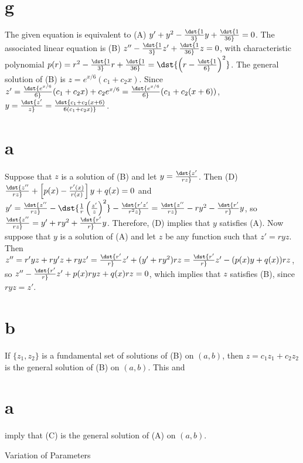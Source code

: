 \documentclass[dvips]{book}
\renewcommand{\exer}[1]{\par\medskip\;\noindent{\color{red}\bf #1.}}
\numberwithin{example}{section}
\numberwithin{equation}{section}
\numberwithin{theorem}{section}
\numberwithin{table}{section}
\numberwithin{figure}{section}
\begin{document}
\part{g} The given equation is equivalent to (A)
$y'+y^2-\dst{1\over3}y+\dst{1\over36}=0$. The associated linear
equation is (B) $z''-\dst{1\over3}z'+\dst{1\over36}z=0$, with
characteristic polynomial $p(r)=r^2-\dst{1\over3}r+\dst{1\over36}=
\dst{\left(r-\dst{1\over6}\right)^2}$. The general solution of (B) is
$z=e^{x/6}(c_1+c_2x)$. Since
$z'=\dst{e^{x/6}\over6}(c_1+c_2x)+c_2e^{x/6}=\dst{e^{x/6}\over6}
(c_1+c_2(x+6))$, $y=\dst{z'\over
z}=\dst{c_1+c_2(x+6)\over6(c_1+c_2x)}$.


\exer{5.6.40}
\part{a} Suppose that $z$ is a solution of (B)
and let $y=\dst{z'\over rz}$. Then
(D) $\dst{z''\over rz}+\left[p(x)-{r'(x)\over r(x)}\right]
y+q(x)=0$
and  $y'=\dst{z''\over rz}-\dst{{1\over r}\left(z'\over
z\right)^2}-\dst{r'z'\over r^2z}=\dst{z''\over
rz}-ry^2-\dst{r'\over r}y$, so
$\dst{z''\over rz}=y'+ry^2+\dst{r'\over r}y$. Therefore,
(D) implies that
$y$
satisfies (A). Now suppose that $y$ is a solution of (A) and let $z$
be any function such that $z'=ryz$. Then $z''=r'yz+ry'z+ryz'=
\dst{r'\over r}z'+
(y'+ry^2)rz
=\dst{r'\over r}z'-(p(x)y+q(x))rz$, so
$z''-\dst{r'\over r}z'+p(x)ryz+q(x)rz=0$,
which implies that $z$ satisfies (B), since $ryz=z'$.

\part{b}  If $\{z_1,z_2\}$ is a fundamental set of solutions of
(B) on  $(a,b)$, then $z=c_1z_1+c_2z_2$ is the general solution of
(B) on $(a,b)$. This and \part{a} imply that (C) is the general
solution of (A) on $(a,b)$.



{Variation of Parameters}
\renewcommand{\thissection}{}
\thissection

\vspace*{-15pt}
\end{document}
